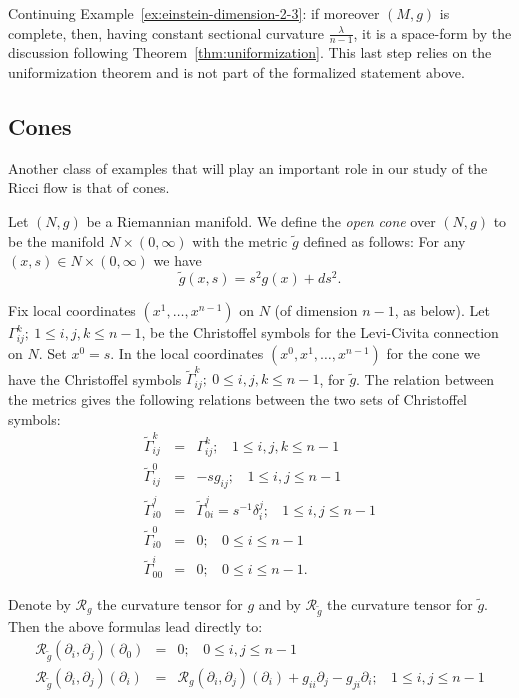 \begin{remark}
\label{rem:einstein-space-form}
Continuing Example~\ref{ex:einstein-dimension-2-3}: if moreover
$(M,g)$ is complete, then, having constant sectional curvature
$\frac{\lambda}{n-1}$, it is a space-form by the discussion following
Theorem~\ref{thm:uniformization}. This last step relies on the
uniformization theorem and is not part of the formalized statement
above.
\end{remark}

\subsection{Cones}

Another class of examples that will play an important role in our
study of the Ricci flow is that of cones.

\begin{definition}
\label{def:cone}
\label{conedefn}
Let $(N,g)$ be a Riemannian manifold. We define the {\em open cone}
over $(N,g)$ to be the manifold $N\times (0,\infty)$ with the metric
$\tilde g$ defined as follows: For any $(x,s)\in N\times (0,\infty)$
we have
$$\tilde g(x,s)=s^2g(x)+ds^2.$$
\end{definition}

Fix local coordinates $(x^1,\ldots,x^{n-1})$ on $N$ (of dimension
$n-1$, as below). Let
$\Gamma_{ij}^k;\ 1\le i,j,k\le n-1$, be the Christoffel symbols for
the Levi-Civita connection on $N$. Set $x^0=s$. In the local
coordinates $(x^0,x^1,\ldots,x^{n-1})$ for the cone we have the
Christoffel symbols $\widetilde \Gamma_{ij}^k;\ 0\le i,j,k\le n-1$,
for $\tilde g$. The relation between the metrics gives the following
relations between the two sets of Christoffel symbols:
\begin{eqnarray*}\widetilde
\Gamma_{ij}^k & = & \Gamma_{ij}^k; \ \ \ \ 1\le i,j,k\le n-1 \\
\widetilde \Gamma_{ij}^0 & = & -sg_{ij}; \ \ \ \ 1\le i,j\le n-1 \\
\widetilde\Gamma_{i0}^j & = & \widetilde\Gamma_{0i}^j =
s^{-1}\delta^j_i; \ \ \ \ 1\le i,j\le n-1 \\
\widetilde \Gamma_{i0}^0 & = & 0;\ \ \ \ 0\le i\le n-1 \\
\widetilde \Gamma_{00}^i & = & 0;\ \  \ \ 0\le i\le n-1.
\end{eqnarray*}

Denote by ${\mathcal R}_g$ the curvature tensor for $g$ and by
${\mathcal R}_{\tilde g}$ the curvature tensor for $\tilde g$. Then
the above formulas lead directly to:
\begin{eqnarray*}
{\mathcal R}_{\tilde g}(\partial_i,\partial_j)(\partial_0) & = & 0;\ \ \ \  0\le i,j\le n-1 \\
{\mathcal R}_{\tilde g}(\partial_i,\partial_j)(\partial_i) & = &
{\mathcal
R}_g(\partial_i,\partial_j)(\partial_i)+g_{ii}\partial_j-g_{ji}\partial_i;\
\ \ \  1\le i,j\le n-1 \\
\end{eqnarray*}

